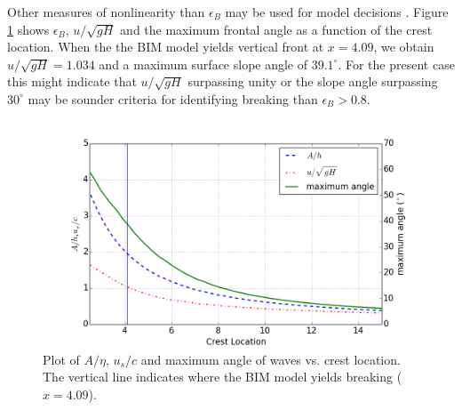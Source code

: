 \documentclass[review]{elsarticle}
\begin{document}
Other measures of nonlinearity than $\epsilon_B$ may be used for model decisions 
\citep{lynett2006nearshore,matsuyama2007study}. Figure \ref{fig:wave_break_criteria} shows 
$\epsilon_B$, $u/\sqrt{gH}$ and the maximum frontal angle 
as a function of the crest location.
When the the BIM model yields vertical front at $x=4.09$, 
we obtain $u/\sqrt{gH} = 1.034$ and a maximum surface slope angle of $39.1^\circ$. 
For the present case this might indicate 
that $u/\sqrt{gH}$ surpassing unity or 
the slope angle surpassing  
$30^\circ$ may be sounder criteria for identifying breaking than $\epsilon_B>0.8$.
 
\begin{figure}[tbh!]
\centering
\includegraphics[width=.7\textwidth]{_fig/wave_break}
\caption{Plot of $A/\eta$, $u_s/c$ and maximum angle of waves vs. crest location. 
The vertical line indicates where the BIM model yields breaking ($x=4.09$). }
\label{fig:wave_break_criteria}
\end{figure}
\end{document}
